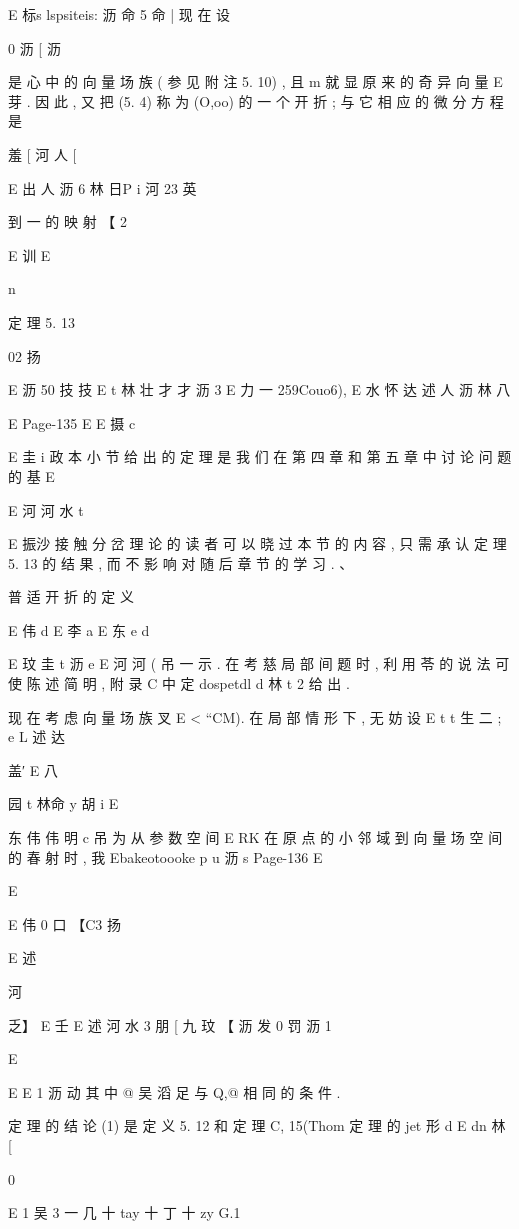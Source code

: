 {{{E 标s lspsiteis: 沥 命 5 命 |
现 在 设

0 沥 [ 沥

是 心 中 的 向 量 场 族 ( 参 见 附 注 5. 10) , 且 m 就 显 原 来 的 奇 异 向 量
E 芽 . 因 此 , 又 把 (5. 4) 称 为 (O,oo) 的 一 个
开 折 ; 与 它 相 应 的 微 分 方 程 是

羞 [ 河 人 [

E 出 人 沥 6 林 日P i 河 23 英

到 一 的 映 射
【 2

E 训
E

n

定 理 5. 13

02 扬

E 沥 50 技 技
E t 林 壮 才 才 沥 3
E
力 一 259Couo6),
E 水 怀 达 述 人 沥 林 八

E
Page-135
E E 摄 c

E 圭 i 政
本 小 节 给 出 的 定 理 是 我 们 在 第 四 章 和 第 五 章 中 讨 论 问 题 的 基
E

E 河 河 水 t

E 振沙
接 触 分 岔 理 论 的 读 者 可 以 晓 过 本 节 的 内 容 , 只 需 承 认 定 理 5. 13 的
结 果 , 而 不 影 响 对 随 后 章 节 的 学 习 . 、

普 适 开 折 的 定 义

E 伟 d
E 李 a
E 东 e d

E 玟 圭 t 沥 e
E 河 河 ( 吊 一
示 . 在 考 慈 局 部 间 题 时 , 利 用 苓 的 说 法 可 使 陈 述 简 明 , 附 录 C 中 定
dospetdl d 林 t 2
给 出 .

现 在 考 虑 向 量 场 族 叉 E < “CM). 在 局 部 情 形 下 , 无 妨 设
E t t 生 二 ; e
L 述 达

盖′ E 八

园 t 林命 y 胡 i
E

东 伟 伟 明 c 吊
为 从 参 数 空 间 E RK 在 原 点 的 小 邻 域 到 向 量 场 空 间 的 春 射 时 , 我
Ebakeotoooke p u 沥 s
Page-136
E

E

E 伟 0 口
【C3 扬

E 述

河

乏】 E
壬 E 述 河 水 3 朋
[ 九
玟
【 沥 发 0 罚 沥 1

E
{ E E
1 沥 动
其 中 @ 吴 滔 足 与 Q,@ 相 同 的 条 件 .

定 理 的 结 论 (1) 是 定 义 5. 12 和 定 理 C, 15(Thom 定 理 的 jet 形
d
E dn 林
[

0

E
1 吴
3 一 几 十 tay 十 丁 十 zy G.1

}}}}
